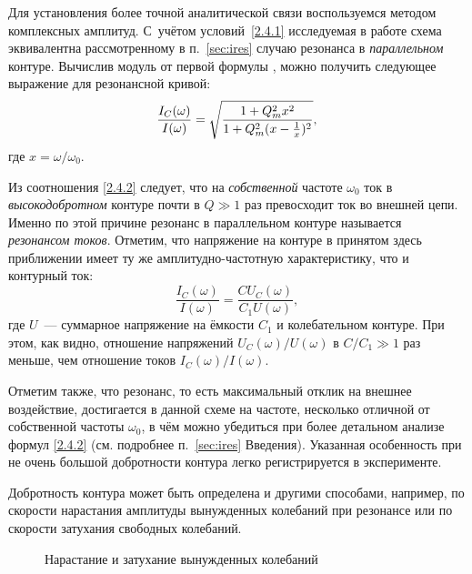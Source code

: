 Для установления более точной аналитической связи воспользуемся 
методом комплексных амплитуд. С~учётом условий~\eqref{2.4.1} 
исследуемая в работе схема эквивалентна рассмотренному в п.~\ref{sec:ires} 
случаю резонанса в \emph{параллельном} контуре. 
Вычислив модуль от первой формулы , можно получить 
следующее выражение
для резонансной кривой:
\begin{equation}
\eqmark{2.4.2}
\frac{I_C(\omega)}{I(\omega)} = 
\sqrt{\frac{1+Q_m^2x^2}{1+Q_m^2(x-\frac1x)^2}},
\end{equation}
где $x=\omega/\omega_0$.

Из соотношения \eqref{2.4.2} следует, 
что на \emph{собственной} частоте $\omega_0$ ток в \emph{высокодобротном} 
контуре почти в $Q\gg 1$ раз превосходит ток во внешней цепи. 
Именно по этой причине резонанс в параллельном контуре называется 
\emph{резонансом токов}. 
Отметим, что напряжение на контуре в принятом здесь приближении имеет ту 
же амплитудно-частотную характеристику, что и контурный ток:
\[
\frac{I_C(\omega)}{I(\omega)} = \frac{CU_C(\omega)}{C_1 U(\omega)},
\]
где $U$~--- суммарное напряжение на ёмкости $C_1$ и колебательном контуре.
При этом, как видно, отношение напряжений $U_C(\omega)/U(\omega)$ в $C/C_1\gg1$ 
раз меньше, чем отношение токов $I_C(\omega)/I(\omega)$.

Отметим также, что резонанс, то есть максимальный отклик на внешнее воздействие, 
достигается в данной схеме на частоте, несколько отличной от собственной частоты 
$\omega_0$, в чём можно убедиться при более детальном анализе формул \eqref{2.4.2}
(см. подробнее п.~\ref{sec:ires} Введения). 
Указанная особенность при не очень большой добротности контура легко регистрируется 
в эксперименте.



Добротность контура может быть определена и другими способами, например, 
по скорости нарастания амплитуды вынужденных колебаний при резонансе 
или по скорости затухания свободных колебаний. 

\begin{figure}[h!]
    \centering
    \caption{Нарастание и затухание вынужденных колебаний}
\end{figure}

